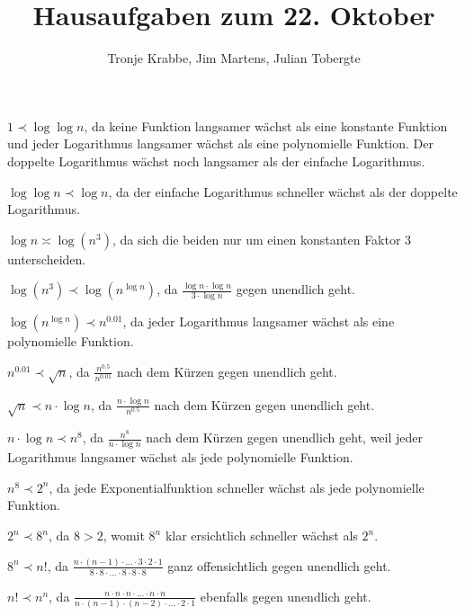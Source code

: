\documentclass[10pt,a4paper,oneside,ngerman,numbers=noenddot]{scrartcl}
\begin{document}
\author{Tronje Krabbe, Jim Martens, Julian Tobergte}
\title{Hausaufgaben zum 22. Oktober}
\maketitle
\section{} %
	\subsection{} %
	$1 \prec \log\log n$, da keine Funktion langsamer wächst als eine konstante Funktion und jeder Logarithmus langsamer wächst als eine polynomielle Funktion. Der doppelte Logarithmus wächst noch langsamer als der einfache Logarithmus.
	
	$\log\log n \prec \log n$, da der einfache Logarithmus schneller wächst als der doppelte Logarithmus.
	
	$\log n \asymp \log(n^{3})$, da sich die beiden nur um einen konstanten Faktor $3$ unterscheiden.
	
	$\log(n^{3}) \prec \log(n^{\log n})$, da $\frac{\log n \cdot \log n}{3 \cdot \log n}$ gegen unendlich geht.
	
	$\log(n^{\log n}) \prec n^{0.01}$, da jeder Logarithmus langsamer wächst als eine polynomielle Funktion.
	
	$n^{0.01} \prec \sqrt{n}$, da $\frac{n^{0.5}}{n^{0.01}}$ nach dem Kürzen gegen unendlich geht.
	
	$\sqrt{n} \prec n \cdot \log n$, da $\frac{n \cdot \log n}{n^{0.5}}$ nach dem Kürzen gegen unendlich geht.
	
	$n \cdot \log n \prec n^{8}$, da $\frac{n^{8}}{n \cdot \log n}$ nach dem Kürzen gegen unendlich geht, weil jeder Logarithmus langsamer wächst als jede polynomielle Funktion.
	
	$n^{8} \prec 2^{n}$, da jede Exponentialfunktion schneller wächst als jede polynomielle Funktion.
	
	$2^{n} \prec 8^{n}$, da $8 > 2$, womit $8^{n}$ klar ersichtlich schneller wächst als $2^{n}$.
	
	$8^{n} \prec n!$, da $\frac{n \cdot (n-1) \cdot ... \cdot 3 \cdot 2 \cdot 1}{8 \cdot 8 \cdot ... \cdot 8 \cdot 8 \cdot 8}$ ganz offensichtlich gegen unendlich geht.
	
	$n! \prec n^{n}$, da $\frac{n \cdot n \cdot n \cdot ... \cdot n \cdot n}{n \cdot (n-1) \cdot (n-2) \cdot ... \cdot 2 \cdot 1}$ ebenfalls gegen unendlich geht.
\end{document}
